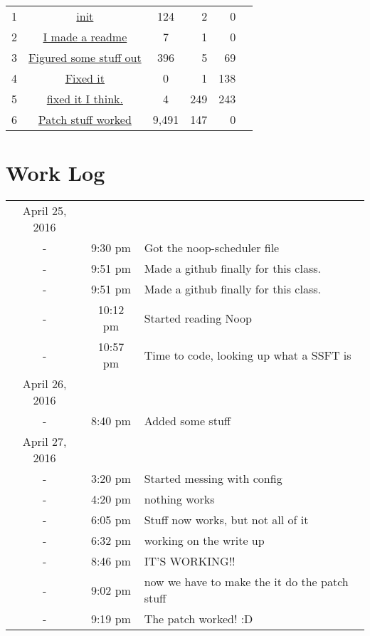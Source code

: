 \documentclass[10pt,journal,compsoc, onecolumn]{IEEEtran}
\begin{document}
\begin{flushleft}
\begin{tabular}{  | l | c | c | r | r | r | }
  1 & \href{https://github.com/Thecmar7/cs444_linux_kernel/tree/cb36b23a110062fbd30def9ea43db3d97767213b}{init}  & 124 & 2 & 0 \\
  2 & \href{https://github.com/Thecmar7/cs444_linux_kernel/commit/c76a4df55e52a3645fc8e5482940c561207625c6}{I made a readme}  & 7 & 1 & 0 \\  
  3 & \href{https://github.com/Thecmar7/cs444_linux_kernel/commit/dcf4f4dba439451101f7b767cebb45012bcad315}{Figured some stuff out}  & 396 & 5 & 69 \\ 
  4 & \href{https://github.com/Thecmar7/cs444_linux_kernel/commit/e0c6b65cb7ff299591dfdb671345264273a0247c}{Fixed it}  & 0 & 1 & 138 \\
  5 & \href{https://github.com/Thecmar7/cs444_linux_kernel/commit/d7ffeeeea4a0e33302805d3dfbcd9d539d80f553}{fixed it I think.}  & 4 & 249 & 243 \\
  6 & \href{https://github.com/Thecmar7/cs444_linux_kernel/commit/8d285e5c143accce0fe949104a59139a4e427d6d}{Patch stuff worked}  & 9,491 & 147 & 0 \\
  
  \hline  
\end{tabular}

\section{Work Log}
\bigskip
\begin{tabular}{ |  c c | l | }

\hline
April 25, 2016 & & \\
 - & 9:30 pm & Got the noop-scheduler file \\
 - & 9:51 pm& Made a github finally for this class. \\
 - & 9:51 pm & Made a github finally for this class. \\
 - & 10:12 pm & Started reading Noop \\
 - & 10:57 pm & Time to code, looking up what a SSFT is \\
 
 April 26, 2016 && \\
  - & 8:40 pm & Added some stuff \\
 
 April 27, 2016 && \\
-&	 3:20 pm	&	Started messing with config \\
-&	 4:20 pm	&	nothing works \\
-&	 6:05 pm	&	Stuff now works, but not all of it \\
-&	 6:32 pm	&	working on the write up \\
-&	 8:46 pm	&	IT'S WORKING!! \\
-&	 9:02 pm	&	now we have to make the it do the patch stuff \\
-&	 9:19 pm	&	The patch worked! :D \\
\hline

\end{tabular}

\end{flushleft}
\end{document}
